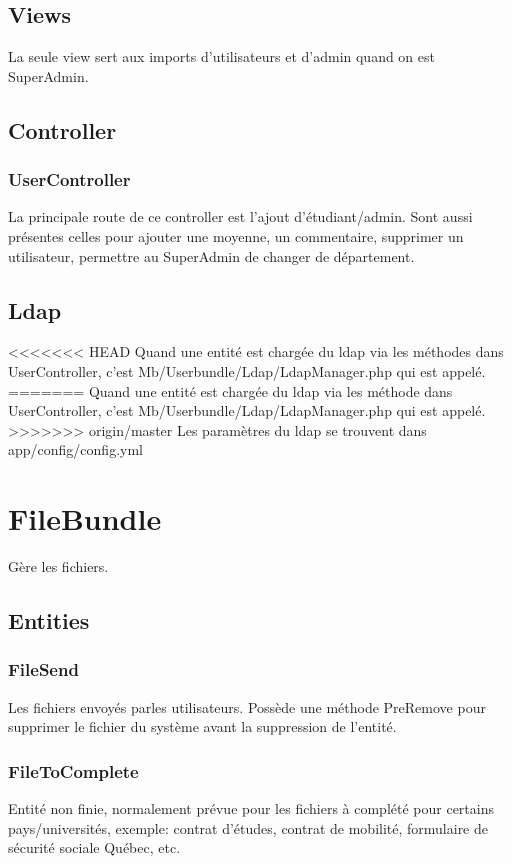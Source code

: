 \subsection{Views}
La seule view sert aux imports d'utilisateurs et d'admin quand on est SuperAdmin.

\subsection{Controller}
\subsubsection{UserController}
La principale route de ce controller est l'ajout d'étudiant/admin.
Sont aussi présentes celles pour ajouter une moyenne, un commentaire, supprimer un utilisateur, permettre au SuperAdmin de changer de département.


\subsection{Ldap}
<<<<<<< HEAD
Quand une entité est chargée du ldap via les méthodes dans UserController, c'est Mb/Userbundle/Ldap/LdapManager.php qui est appelé.
=======
Quand une entité est chargée du ldap via les méthode dans UserController, c'est  Mb/Userbundle/Ldap/LdapManager.php qui est appelé.
>>>>>>> origin/master
Les paramètres du ldap se trouvent dans app/config/config.yml


\section{FileBundle}
Gère les fichiers.

\subsection{Entities}
\subsubsection{FileSend}
Les fichiers envoyés parles utilisateurs. Possède une méthode PreRemove pour supprimer le fichier du système avant la suppression de l'entité.

\subsubsection{FileToComplete}
Entité non finie, normalement prévue pour les fichiers à complété pour certains pays/universités, exemple: contrat d'études, contrat de mobilité, formulaire de sécurité sociale Québec, etc.


